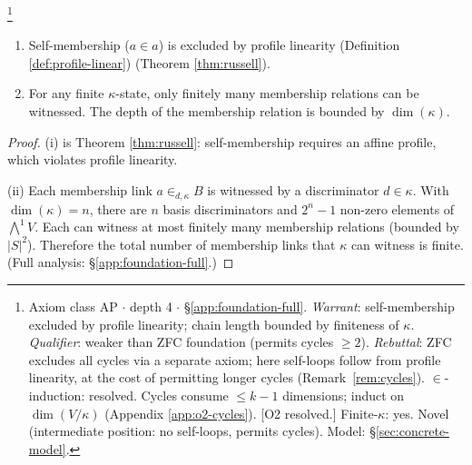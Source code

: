 \begin{theorem}\label{thm:foundation}\footnote{Axiom class \textsf{AP} $\cdot$ depth 4 $\cdot$ \S\ref{app:foundation-full}.  \emph{Warrant}: self-membership excluded by profile linearity; chain length bounded by finiteness of $\kappa$. \emph{Qualifier}: weaker than ZFC foundation (permits cycles $\geq 2$). \emph{Rebuttal}: ZFC excludes all cycles via a separate axiom; here self-loops follow from profile linearity, at the cost of permitting longer cycles (Remark~\ref{rem:cycles}). $\in$-induction: resolved. Cycles consume $\leq k{-}1$ dimensions; induct on $\dim(V/\kappa)$ (Appendix \ref{app:o2-cycles}). [O2 resolved.] Finite-$\kappa$: yes. Novel (intermediate position: no self-loops, permits cycles). Model: \S\ref{sec:concrete-model}.}
\begin{enumerate}[label=(\roman*),nosep]
  \item Self-membership ($a \in a$) is excluded by
    profile linearity (Definition \ref{def:profile-linear}) (Theorem \ref{thm:russell}).
  \item For any finite $\kappa$-state, only finitely many
    membership relations can be witnessed. The depth of the
    membership relation is bounded by $\dim(\kappa)$.
\end{enumerate}
\end{theorem}

\begin{proof}
(i) is Theorem \ref{thm:russell}: self-membership
requires an affine profile, which violates profile
linearity.

(ii) Each membership link $a \in_{d,\kappa} B$ is
witnessed by a discriminator $d \in \kappa$. With
$\dim(\kappa) = n$, there are $n$ basis discriminators
and $2^n - 1$ non-zero elements of $\bigwedge^1 V$. Each
can witness at most finitely many membership relations
(bounded by $|S|^2$). Therefore the total number of
membership links that $\kappa$ can witness is finite.
(Full analysis: \S\ref{app:foundation-full}.)
\end{proof}

